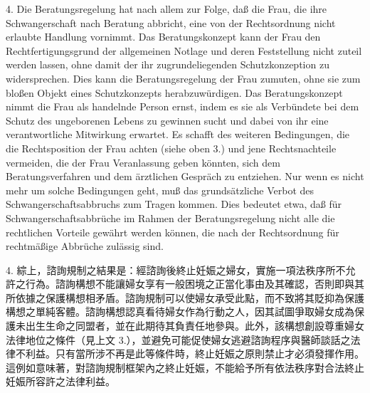 \documentclass[12pt]{article}
\begin{document}
\begin{sourcepara}[title={原文D.106}]
4. Die Beratungsregelung hat nach allem zur Folge, daß die Frau, die ihre Schwangerschaft nach Beratung abbricht, eine von der Rechtsordnung nicht erlaubte Handlung vornimmt. Das Beratungskonzept kann der Frau den Rechtfertigungsgrund der allgemeinen Notlage und deren Feststellung nicht zuteil werden lassen, ohne damit der ihr zugrundeliegenden Schutzkonzeption zu widersprechen. Dies kann die Beratungsregelung der Frau zumuten, ohne sie zum bloßen Objekt eines Schutzkonzepts herabzuwürdigen. Das Beratungskonzept nimmt die Frau als handelnde Person ernst, indem es sie als Verbündete bei dem Schutz des ungeborenen Lebens zu gewinnen sucht und dabei von ihr eine verantwortliche Mitwirkung erwartet. Es schafft des weiteren Bedingungen, die die Rechtsposition der Frau achten (siehe oben 3.) und jene Rechtsnachteile vermeiden, die der Frau Veranlassung geben könnten, sich dem Beratungsverfahren und dem ärztlichen Gespräch zu entziehen. Nur wenn es nicht mehr um solche Bedingungen geht, muß das grundsätzliche Verbot des Schwangerschaftsabbruchs zum Tragen kommen. Dies bedeutet etwa, daß für Schwangerschaftsabbrüche im Rahmen der Beratungsregelung nicht alle die rechtlichen Vorteile gewährt werden können, die nach der Rechtsordnung für rechtmäßige Abbrüche zulässig sind.
\end{sourcepara}
\begin{transpara}
4. 綜上，諮詢規制之結果是：經諮詢後終止妊娠之婦女，實施一項法秩序所不允許之行為。諮詢構想不能讓婦女享有一般困境之正當化事由及其確認，否則即與其所依據之保護構想相矛盾。諮詢規制可以使婦女承受此點，而不致將其貶抑為保護構想之單純客體。諮詢構想認真看待婦女作為行動之人，因其試圖爭取婦女成為保護未出生生命之同盟者，並在此期待其負責任地參與。此外，該構想創設尊重婦女法律地位之條件（見上文 3.），並避免可能促使婦女逃避諮詢程序與醫師談話之法律不利益。只有當所涉不再是此等條件時，終止妊娠之原則禁止才必須發揮作用。這例如意味著，對諮詢規制框架內之終止妊娠，不能給予所有依法秩序對合法終止妊娠所容許之法律利益。
\end{transpara}

\end{document}

